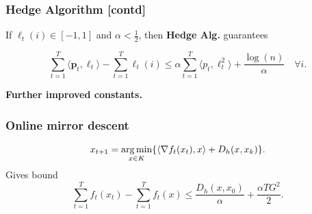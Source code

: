 \documentclass{beamer}
\begin{document}
\begin{frame}
  \frametitle{Hedge Algorithm [contd]}

  \begin{theorem}
    If $\ell_t(i) \in [-1, 1]$ and $\alpha < \frac12$, then \textbf{Hedge Alg.} guarantees

    \begin{equation}
      \sum_{t=1}^{T} \langle \bm{p}_t, \bm{\ell}_t \rangle  - \sum_{t=1}^{T} \ell_t(i) \le \alpha \sum_{t=1}^{T} \langle p_t, \ell_t^2 \rangle + \frac{\log(n)}{\alpha} \quad \forall i.
    \end{equation}
  \end{theorem}
  \textbf{Further improved constants.}
\end{frame}


\begin{frame}
  \frametitle{Online mirror descent}
  \begin{align}
    x_{t+1} = \operatorname*{arg\,min}_{x \in K} \{ \langle \nabla f_t(x_t), x \rangle + D_h(x, x_k)\}.
  \end{align}
  Gives bound
  \begin{equation}
    \sum_{t=1}^{T} f_t(x_t) -\sum_{t=1}^{T} f_t(x) \le \frac{D_h(x, x_0)}{\alpha} + \frac{\alpha T G^2}{2}.
  \end{equation}


\end{frame}
\end{document}
